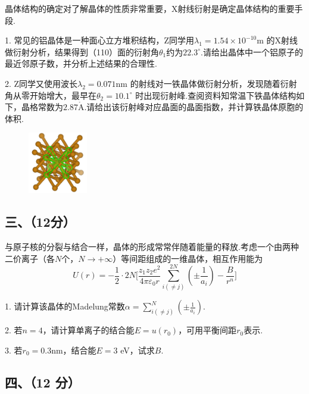 \documentclass{ctexart}
\begin{document}
晶体结构的确定对了解晶体的性质非常重要，X射线衍射是确定晶体结构的重要手段.\par
1. 常见的铝晶体是一种面心立方堆积结构，Z同学用$\lambda_1 =1.54 \times 10 ^{-10}$m 的X射线做衍射分析，结果得到（110）面的衍射角$\theta_1$约为$22.3^{\circ}$.请给出晶体中一个铝原子的最近邻原子数，并分析上述结果的合理性.\par
2. Z同学又使用波长$\lambda_2 = 0.071$nm 的射线对一铁晶体做衍射分析，发现随着衍射角从零开始增大，最早在$\theta_2 = 10.1^{\circ}$ 时出现衍射峰.查阅资料知常温下铁晶体结构如下，晶格常数为$2.87\mathring{\text{A}}$.请给出该衍射峰对应晶面的晶面指数，并计算铁晶体原胞的体积.
\vspace{-0.2cm}
\begin{figure}[htbp]
    \flushright
    \includegraphics[width=0.23\textwidth]{1.png}
\end{figure}

\vspace{2cm}

\subsection*{三、（12分）}

与原子核的分裂与结合一样，晶体的形成常常伴随着能量的释放.考虑一个由两种二价离子（各$N$个，$N\rightarrow +\infty$）等间距组成的一维晶体，相互作用能为
\[
U(r)=-\frac{1}{2}\cdot 2N\Biggl[\frac{z_{1}z_{2}e^{2}}{4\pi\varepsilon_{0}r}\sum_{i(\neq j)}^{2N}(\pm\frac{1}{a_{i}})-\frac{B}{r^{n}}\Biggr]
\]

1. 请计算该晶体的Madelung常数$\alpha = \sum_{i(\neq j)}^{N}(\pm\frac{1}{a_{i}})$.\par
2. 若$n=4$，请计算单离子的结合能$E=u(r_0)$，可用平衡间距$r_0$表示.\par
3. 若$r_0=0.3$nm，结合能$E=3$ eV，试求$B$.

\newpage
\subsection*{四、（12 分）}
\end{document}
